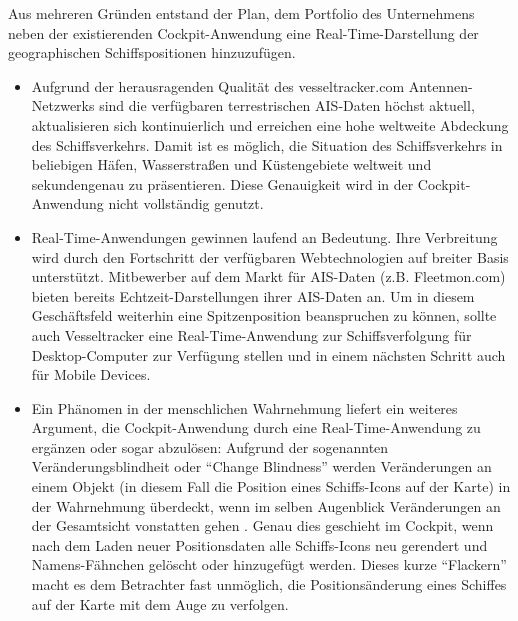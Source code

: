 Aus mehreren Gründen entstand der Plan, dem Portfolio des Unternehmens neben der existierenden Cockpit-Anwendung eine Real-Time-Darstellung der geographischen Schiffspositionen hinzuzufügen.
\begin{itemize}

\item Aufgrund der herausragenden Qualität des vesseltracker.com Antennen-Netzwerks sind die verfügbaren terrestrischen AIS-Daten höchst aktuell, aktualisieren sich kontinuierlich und erreichen eine hohe weltweite Abdeckung des Schiffsverkehrs. Damit ist es möglich, die Situation des Schiffsverkehrs in beliebigen Häfen, Wasserstraßen und Küstengebiete weltweit und sekundengenau zu präsentieren. Diese Genauigkeit wird in der Cockpit-Anwendung nicht vollständig genutzt.

\item Real-Time-Anwendungen gewinnen laufend an Bedeutung. Ihre Verbreitung wird durch den Fortschritt der verfügbaren Webtechnologien auf breiter Basis unterstützt. Mitbewerber auf dem Markt für AIS-Daten (z.B. Fleetmon.com) bieten bereits Echtzeit-Darstellungen ihrer AIS-Daten an. Um in diesem Geschäftsfeld weiterhin eine Spitzenposition beanspruchen zu können, sollte auch Vesseltracker eine Real-Time-Anwendung zur Schiffsverfolgung für Desktop-Computer zur Verfügung stellen und in einem nächsten Schritt auch für Mobile Devices.
\item Ein Phänomen in der menschlichen Wahrnehmung liefert ein weiteres Argument, die Cockpit-Anwendung durch eine Real-Time-Anwendung zu ergänzen oder sogar abzulösen: Aufgrund der sogenannten Veränderungsblindheit oder “Change Blindness” werden Veränderungen an einem Objekt (in diesem Fall die Position eines Schiffs-Icons auf der Karte) in der Wahrnehmung überdeckt, wenn im selben Augenblick Veränderungen an der Gesamtsicht vonstatten gehen \cite{changeblindness}. Genau dies geschieht im Cockpit, wenn nach dem Laden neuer Positionsdaten alle Schiffs-Icons neu gerendert und Namens-Fähnchen gelöscht oder hinzugefügt werden. Dieses kurze “Flackern” macht es dem Betrachter fast unmöglich, die Positionsänderung eines Schiffes auf der Karte mit dem Auge zu verfolgen.
\end{itemize}


